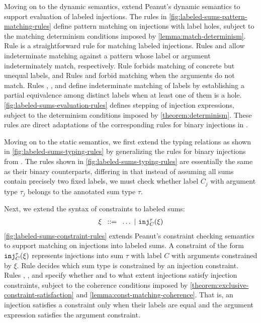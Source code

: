 
Moving on to the dynamic semantics, 
extend Peanut's dynamic semantics to support evaluation of labeled injections.
The rules in \autoref{fig:labeled-sums-pattern-matching-rules} define pattern matching on injections with label holes,
subject to the matching determinism conditions imposed by \autoref{lemma:match-determinism}.
Rule \MInj is a straightforward rule for matching labeled injections.
Rules \MMInjTag and \MMInjArg allow indeterminate matching against a pattern whose label or argument indeterminately match, respectively.
Rule \NMInj forbids matching of concrete but unequal labels, and
Rules \NMInjTag and \NMInjArg forbid matching when the arguments do not match.
Rules \TMMSym, \TMMHole, and \TMMEHole define indeterminate matching of labels
by establishing a partial equivalence among distinct labels when at least one of them is a hole.
\autoref{fig:labeled-sums-evaluation-rules} defines stepping of injection expressions,
subject to the determinism conditions imposed by \autoref{theorem:determinism}.
These rules are direct adaptations of the corresponding rules for binary injections in .



Moving on to the static semantics, we first extend the typing relations as shown in \autoref{fig:labeled-sums-typing-rules}
by generalizing the rules for binary injections from .
The rules shown in \autoref{fig:labeled-sums-typing-rules} are essentially the same as their binary counterparts,
differing in that instead of assuming all sums contain precisely two fixed labels,
we must check whether label $C_j$ with argument type $\tau_j$ belongs to the annotated sum type $\tau$.


Next, we extend the syntax of constraints to labeled sums:
\[
  \arraycolsep=4pt\begin{array}{lll}
    \xi & ::= & \ldots ~\vert~ \cinj{C}{\tau}{\xi}
  \end{array}
\]
\autoref{fig:labeled-sums-constraint-rules} extends Peanut's constraint checking semantics to support matching on injections into labeled sums.
A constraint of the form $\mathtt{inj}_{C}^{\tau}(\xi)$ represents injections into sum $\tau$ with label $C$ with arguments constrained by $\xi$.
Rule \CTInj decides which sum type is constrained by an injection constraint.
Rules \CSInj, \CMSInjTag, and \CMSInjArg specify whether and to what extent injections satisfy injection constraints,
subject to the coherence conditions imposed by \autoref{theorem:exclusive-constraint-satisfaction} and \autoref{lemma:const-matching-coherence}.
That is, an injection satisfies a constraint only when their labels are equal and the argument expression satisfies the argument constraint.


